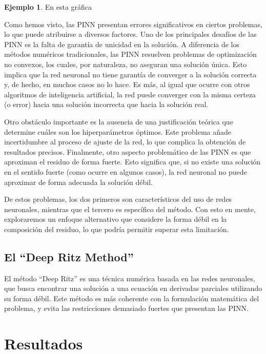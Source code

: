 \documentclass[a4paper,11pt,spanish, twoside, leqno]{tfg-uam}
\theoremstyle{definition}
\newtheorem{exmp}[teor]{Ejemplo}
\begin{document}
\begin{mdframed}
\begin{exmp}
        En esta gráfica

    \end{exmp}
\end{mdframed}

Como hemos visto, las PINN presentan errores significativos en ciertos problemas, lo que puede atribuirse a diversos factores. Uno de los principales desafíos de las PINN es la falta de garantía de unicidad en la solución. A diferencia de los métodos numéricos tradicionales, las PINN resuelven problemas de optimización no convexos, los cuales, por naturaleza, no aseguran una solución única. Esto implica que la red neuronal no tiene garantía de converger a la solución correcta y, de hecho, en muchos casos no lo hace. Es más, al igual que ocurre con otros algoritmos de inteligencia artificial, la red puede converger con la misma certeza (o error) hacia una solución incorrecta que hacia la solución real.

Otro obstáculo importante es la ausencia de una justificación teórica que determine cuáles son los hiperparámetros óptimos. Este problema añade incertidumbre al proceso de ajuste de la red, lo que complica la obtención de resultados precisos. Finalmente, otro aspecto problemático de las PINN es que aproximan el residuo de forma fuerte. Esto significa que, si no existe una solución en el sentido fuerte (como ocurre en algunos casos), la red neuronal no puede aproximar de forma adecuada la solución débil.

De estos problemas, los dos primeros son característicos del uso de redes neuronales, mientras que el tercero es específico del método. Con esto en mente, exploraremos un enfoque alternativo que considere la forma débil en la composición del residuo, lo que podría permitir superar esta limitación.


\section{El ``Deep Ritz Method''}

El método ``Deep Ritz'' es una técnica numérica basada en las redes neuronales, que busca encontrar una solución a una ecuación en derivadas parciales utilizando su forma débil. Este método es más coherente con la formulación matemática del problema, y evita las restricciones demasiado fuertes que presentan las PINN.

\chapter{Resultados}\label{chap3}
\end{document}
